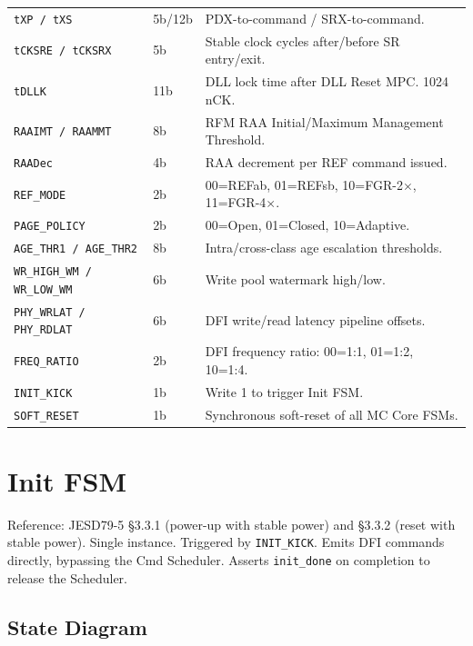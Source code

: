 \documentclass[10pt,a4paper]{article}
\newcommand{\RA}{\rowcolor{white}}
\newcommand{\RB}{\rowcolor{altbg}}
\begin{document}
\begin{center}
\begin{tabularx}{\linewidth}{@{} l l X @{}}
\RB \texttt{tXP / tXS} & 5b/12b & PDX-to-command / SRX-to-command. \\
\RA \texttt{tCKSRE / tCKSRX} & 5b & Stable clock cycles after/before SR entry/exit. \\
\RB \texttt{tDLLK} & 11b & DLL lock time after DLL Reset MPC. 1024\,nCK. \\
\RA \texttt{RAAIMT / RAAMMT} & 8b & RFM RAA Initial/Maximum Management Threshold. \\
\RB \texttt{RAADec} & 4b & RAA decrement per REF command issued. \\
\RA \texttt{REF\_MODE} & 2b & 00=REFab, 01=REFsb, 10=FGR-2$\times$, 11=FGR-4$\times$. \\
\RB \texttt{PAGE\_POLICY} & 2b & 00=Open, 01=Closed, 10=Adaptive. \\
\RA \texttt{AGE\_THR1 / AGE\_THR2} & 8b & Intra/cross-class age escalation thresholds. \\
\RB \texttt{WR\_HIGH\_WM / WR\_LOW\_WM} & 6b & Write pool watermark high/low. \\
\RA \texttt{PHY\_WRLAT / PHY\_RDLAT} & 6b & DFI write/read latency pipeline offsets. \\
\RB \texttt{FREQ\_RATIO} & 2b & DFI frequency ratio: 00=1:1, 01=1:2, 10=1:4. \\
\RA \texttt{INIT\_KICK} & 1b & Write 1 to trigger Init FSM. \\
\RB \texttt{SOFT\_RESET} & 1b & Synchronous soft-reset of all MC Core FSMs. \\
\bottomrule
\end{tabularx}
\end{center}

\section{Init FSM}

Reference: JESD79-5 \S3.3.1 (power-up with stable power) and \S3.3.2 (reset with stable
power). Single instance. Triggered by \texttt{INIT\_KICK}. Emits DFI commands directly,
bypassing the Cmd Scheduler. Asserts \texttt{init\_done} on completion to release the
Scheduler.

\subsection{State Diagram}
\end{document}
